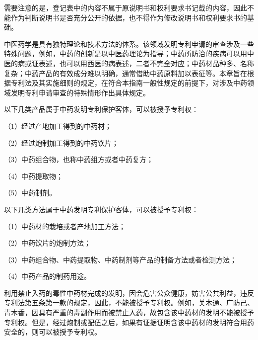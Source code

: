 需要注意的是，登记表中的内容不属于原说明书和权利要求书记载的内容，因此不能作为判断说明书是否充分公开的依据，也不得作为修改说明书和权利要求书的基础。

中医药学是具有独特理论和技术方法的体系。该领域发明专利申请的审查涉及一些特殊问题，例如，中药的创新是以中医药理论为指导；中药所防治的疾病可以用中医的病或证表述，也可以用西医的病表述，二者不完全对应；中药材品种多、名称复杂；中药产品的有效成分难以明确，通常借助中药原料加以表征等。本章旨在根据专利法及其实施细则的规定，在符合本指南一般性规定的前提下，对涉及中药领域发明专利申请审查的特殊情形作出具体规定。

以下几类产品属于中药发明专利保护客体，可以被授予专利权：

{\setlength{\parindent}{17.1bp}（1）经过产地加工得到的中药材；\par}

{\setlength{\parindent}{17.1bp}（2）经过炮制加工得到的中药饮片；\par}

{\setlength{\parindent}{17.1bp}（3）中药组合物，也称中药组方或者中药复方；\par}

{\setlength{\parindent}{17.1bp}（4）中药提取物；\par}

{\setlength{\parindent}{17.1bp}（5）中药制剂。\par}

以下几类方法属于中药发明专利保护客体，可以被授予专利权：

{\setlength{\parindent}{17.1bp}（1）中药材的栽培或者产地加工方法；\par}

{\setlength{\parindent}{17.1bp}（2）中药饮片的炮制方法；\par}

{\setlength{\parindent}{17.1bp}（3）中药组合物、中药提取物、中药制剂等产品的制备方法或者检测方法；\par}

{\setlength{\parindent}{17.1bp}（4）中药产品的制药用途。\par}

利用禁止入药的毒性中药材完成的发明，因会危害公众健康，妨害公共利益，违反专利法第五条第一款的规定，因此，不能被授予专利权。例如，关木通、广防己、青木香，因具有严重的毒副作用而被禁止入药，故包含该中药材的发明不能被授予专利权。但是，经过炮制或配伍之后，如果有证据证明含该中药材的发明符合用药安全的，则可以被授予专利权。

